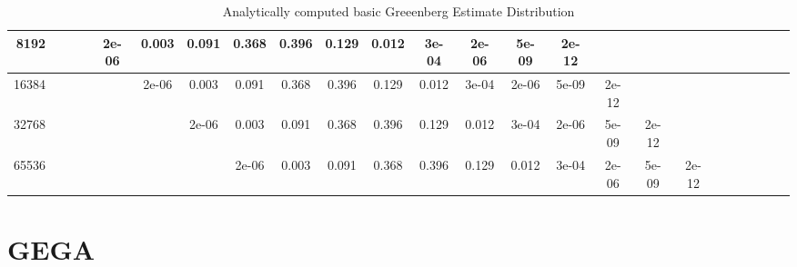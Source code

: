\begin{appendices}
\begin{sidewaystable}
{\begin{tabular}{r|ccccccccccccccccccccccc}
8192 &&&&2e-06 &0.003 &0.091 &0.368 &0.396 &0.129 &0.012 &3e-04 &2e-06 &5e-09 &2e-12 &&&\\\hline

16384 &&&&&2e-06 &0.003 &0.091 &0.368 &0.396 &0.129 &0.012 &3e-04 &2e-06 &5e-09 &2e-12 &&\\\hline

32768 &&&&&&2e-06 &0.003 &0.091 &0.368 &0.396 &0.129 &0.012 &3e-04 &2e-06 &5e-09 &2e-12 &\\\hline

65536 &&&&&&&2e-06 &0.003 &0.091 &0.368 &0.396 &0.129 &0.012 &3e-04 &2e-06 &5e-09 &2e-12\\

\bottomrule
\end{tabular}
}
\caption{Analytically computed basic Greeenberg Estimate Distribution}
\label{basic-greenberg-stop-probabilities}

\end{sidewaystable}


\clearpage
\section{GEGA}


\end{appendices}
